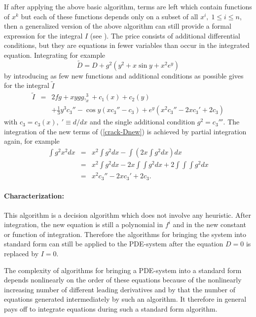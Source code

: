 If after applying the above basic algorithm, terms are left which
contain functions of $x^k$ but each of these functions depends only on
a subset of all $x^i, \; 1\leq i\leq n$, then a generalized version of
the above algorithm can still provide a formal expression for the
integral $I$ (see \cite{Wolf:2000}).  The price consists of additional
differential conditions, but they are equations in fewer variables
than occur in the integrated equation.  Integrating for example
\begin{equation}
\tilde{D} = D + g^2(y^2 + x\sin y + x^2e^y) \label{crack-Dnew}
\end{equation}
by introducing as few new functions and additional conditions as
possible gives for the integral $\tilde{I}$
\begin{eqnarray*}
\tilde{I} & = & 2fg + xygg,_{x}^{3} + c_1(x) + c_2(y) \\
          &   & + \frac{1}{3}y^3c_3'' - \cos y(xc_3'' - c_3)
+ e^y(x^2c_3'' - 2xc_3' + 2c_3)
\end{eqnarray*}
with $c_3 = c_3(x), \; '\equiv d/dx$ and the single additional
condition $g^2 = c_3'''$.  The integration of the new terms of
(\ref{crack-Dnew}) is achieved by partial integration again, for
example
\begin{eqnarray*}
\int g^2x^2 dx & = & x^2\int g^2 dx - \int (2x\!\int g^2 dx) dx \\
              & = & x^2\int g^2 dx - 2x\int\!\!\int g^2 dx
                    + 2 \int\!\!\int\!\!\int g^2 dx \\
              & = & x^2c_3'' - 2xc_3' + 2c_3.
\end{eqnarray*}

\paragraph*{Characterization:}

This algorithm is a decision algorithm which does not involve any
heuristic.  After integration, the new equation is still a polynomial
in $f^i$ and in the new constant or function of integration.
Therefore the algorithms for bringing the system into standard form
can still be applied to the PDE-system after the equation $D = 0$ is
replaced by $I = 0$.

The complexity of algorithms for bringing a PDE-system into a standard
form depends nonlinearly on the order of these equations because of
the nonlinearly increasing number of different leading derivatives and
by that the number of equations generated intermediately by such an
algorithm.  It therefore in general pays off to integrate equations
during such a standard form algorithm.

